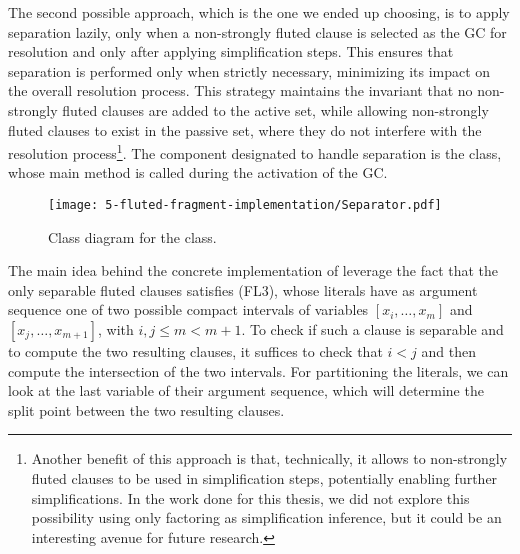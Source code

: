 The second possible approach, which is the one we ended up choosing, is to apply separation lazily, only when a non-strongly fluted clause is selected as the GC for resolution and only after applying simplification steps.
This ensures that separation is performed only when strictly necessary, minimizing its impact on the overall resolution process.
This strategy maintains the invariant that no non-strongly fluted clauses are added to the active set, while allowing non-strongly fluted clauses to exist in the passive set, where they do not interfere with the resolution process\footnote{
  Another benefit of this approach is that, technically, it allows to non-strongly fluted clauses to be used in simplification steps, potentially enabling further simplifications.
  In the work done for this thesis, we did not explore this possibility using only factoring as simplification inference, but it could be an interesting avenue for future research.
}.
The component designated to handle separation is the  class, whose main method  is called during the activation of the GC\@.

\begin{figure}[H]
  \centering
  \texttt{[image: 5-fluted-fragment-implementation/Separator.pdf]}
  \caption{Class diagram for the  class.}\label{fig:separator-class-diagram}
\end{figure}

The main idea behind the concrete implementation of  leverage the fact that the only separable fluted clauses satisfies (FL3), whose literals have as argument sequence one of two possible compact intervals of variables \([x_i,\ldots,x_m]\) and \([x_j,\ldots,x_{m+1}]\), with \(i,j \leq m < m+1\).
To check if such a clause is separable and to compute the two resulting clauses, it suffices to check that \(i < j\) and then compute the intersection of the two intervals. For partitioning the literals, we can look at the last variable of their argument sequence, which will determine the split point between the two resulting clauses.

